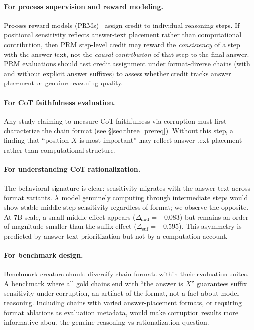 \documentclass{article}
\theoremstyle{definition}
\theoremstyle{definition}
\begin{document}
\paragraph{For process supervision and reward modeling.}
Process reward models (PRMs)~\citep{lightman2023,uesato2022} assign credit to
individual reasoning steps. If positional sensitivity reflects answer-text
placement rather than computational contribution,
then PRM step-level credit may reward the \emph{consistency} of a step
with the answer text, not the \emph{causal contribution} of that
step to the final answer. PRM
evaluations should test credit assignment under format-diverse chains (with and
without explicit answer suffixes) to assess whether credit tracks answer
placement or genuine reasoning quality.

\paragraph{For CoT faithfulness evaluation.}
Any study claiming to measure CoT faithfulness via corruption must first
characterize the chain format (see \S\ref{sec:three_prereq}).
Without this step, a finding that ``position $X$ is most important'' may
reflect answer-text placement rather than computational structure.

\paragraph{For understanding CoT rationalization.}
The behavioral signature is clear: sensitivity migrates with the answer text
across format variants. A model genuinely computing through intermediate steps
would show stable middle-step sensitivity regardless of format; we observe
the opposite. At 7B scale, a small middle effect appears
($\Delta_\text{mid}{=}{-}0.083$) but remains an order of magnitude smaller
than the suffix effect ($\Delta_\text{suf}{=}{-}0.595$). This asymmetry is
predicted by answer-text prioritization but not by a computation account.

\paragraph{For benchmark design.}
Benchmark creators should diversify chain formats within their evaluation
suites. A benchmark where all gold chains end with ``the answer is $X$''
guarantees suffix sensitivity under corruption, an artifact of the format,
not a fact about model reasoning. Including chains with varied answer-placement
formats, or requiring format ablations as evaluation metadata, would make
corruption results more informative about the genuine reasoning-vs-rationalization
question.
\end{document}
